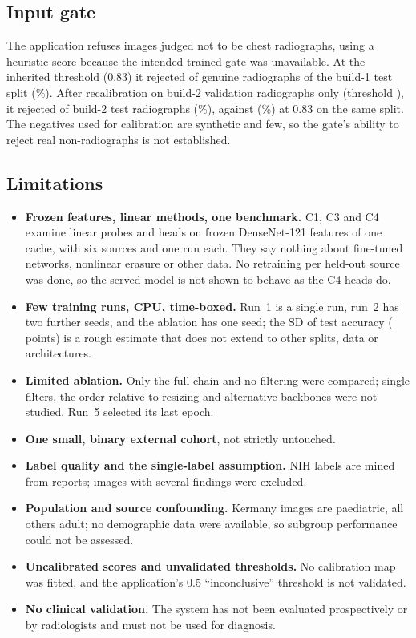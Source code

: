 \subsection{Input gate}
\label{sec:disc-gate}
The application refuses images judged not to be chest radiographs, using a heuristic score because the intended trained gate was unavailable. At the inherited threshold (0.83) it rejected \RCxrGateBOneOldTestRej{} of \RCxrGateBOneOldTestN{} genuine radiographs of the build-1 test split (\RCxrGateBOneOldTestRejPct\%). After recalibration on build-2 validation radiographs only (threshold \RCxrGateNewThr), it rejected \RCxrGateBTwoNewTestRej{} of \RCxrGateBTwoOldTestN{} build-2 test radiographs (\RCxrGateBTwoNewTestRejPct\%), against \RCxrGateBTwoOldTestRej{} (\RCxrGateBTwoOldTestRejPct\%) at 0.83 on the same split. The negatives used for calibration are synthetic and few, so the gate's ability to reject real non-radiographs is not established.
\subsection{Limitations}
\label{sec:limitations}
\begin{itemize}
\item \textbf{Frozen features, linear methods, one benchmark.} C1, C3 and C4 examine linear probes and heads on frozen DenseNet-121 features of one cache, with six sources and one run each. They say nothing about fine-tuned networks, nonlinear erasure or other data. No retraining per held-out source was done, so the served model is not shown to behave as the C4 heads do.
\item \textbf{Few training runs, CPU, time-boxed.} Run~1 is a single run, run~2 has two further seeds, and the ablation has one seed; the SD of test accuracy (\RMSTestAccSD{} points) is a rough estimate that does not extend to other splits, data or architectures.
\item \textbf{Limited ablation.} Only the full chain and no filtering were compared; single filters, the order relative to resizing and alternative backbones were not studied. Run~5 selected its last epoch.
\item \textbf{One small, binary external cohort}, not strictly untouched.
\item \textbf{Label quality and the single-label assumption.} NIH labels are mined from reports; images with several findings were excluded.
\item \textbf{Population and source confounding.} Kermany images are paediatric, all others adult; no demographic data were available, so subgroup performance~\cite{seyyedkalantari2021underdiagnosis} could not be assessed.
\item \textbf{Uncalibrated scores and unvalidated thresholds.} No calibration map was fitted, and the application's 0.5 ``inconclusive'' threshold is not validated.
\item \textbf{No clinical validation.} The system has not been evaluated prospectively or by radiologists and must not be used for diagnosis.
\end{itemize}


